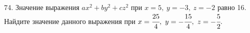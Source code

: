 74. Значение выражения $ax^2+by^2+cz^2$ при $x=5,\ y=-3,\ z=-2$ равно 16. Найдите значение данного выражения при $x=\cfrac{25}{4},\ y=-\cfrac{15}{4},\ z=-\cfrac{5}{2}.$\\
